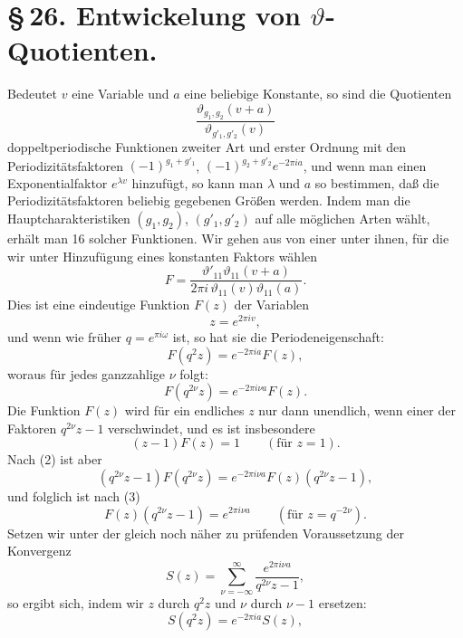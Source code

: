 \documentclass[11pt]{article}
\providecommand{\tht}{\vartheta}
\begin{document}
\section*{\S\,26. Entwickelung von $\vartheta$-Quotienten.}

Bedeutet $v$ eine Variable und $a$ eine beliebige Konstante, so sind die Quotienten
\[
\frac{\tht_{g_1,g_2}(v+a)}{\tht_{g'_1,g'_2}(v)}
\]
doppeltperiodische Funktionen zweiter Art und erster Ordnung mit den Periodizitätsfaktoren $(-1)^{g_1+g'_1}$, $(-1)^{g_2+g'_2}e^{-2\pi ia}$, und wenn man einen Exponentialfaktor $e^{\lambda v}$ hinzufügt, so kann man $\lambda$ und $a$ so bestimmen, daß die Periodizitätsfaktoren beliebig gegebenen Größen werden. Indem man die Hauptcharakteristiken $(g_1,g_2)$, $(g'_1,g'_2)$ auf alle möglichen Arten wählt, erhält man 16 solcher Funktionen. Wir gehen aus von einer unter ihnen, für die wir unter Hinzufügung eines konstanten Faktors wählen
\begin{equation}
F=\frac{\tht'_{11}\tht_{11}(v+a)}{2\pi i\,\tht_{11}(v)\tht_{11}(a)}.
\tag{1}
\end{equation}
Dies ist eine eindeutige Funktion $F(z)$ der Variablen
\[
z=e^{2\pi iv},
\]
und wenn wie früher $q=e^{\pi i\omega}$ ist, so hat sie die Periodeneigenschaft:
\begin{equation}
F(q^2z)=e^{-2\pi ia}F(z),
\tag{2}
\end{equation}
woraus für jedes ganzzahlige $\nu$ folgt:
\[
F(q^{2\nu}z)=e^{-2\pi i\nu a}F(z).
\]
Die Funktion $F(z)$ wird für ein endliches $z$ nur dann unendlich, wenn einer der Faktoren $q^{2\nu}z-1$ verschwindet, und es ist insbesondere
\begin{equation}
(z-1)F(z)=1\qquad (\text{für }z=1).
\tag{3}
\end{equation}
Nach (2) ist aber
\[
(q^{2\nu}z-1)F(q^{2\nu}z)=e^{-2\pi i\nu a}F(z)(q^{2\nu}z-1),
\]
und folglich ist nach (3)
\begin{equation}
F(z)(q^{2\nu}z-1)=e^{2\pi i\nu a}\qquad (\text{für }z=q^{-2\nu}).
\tag{4}
\end{equation}
Setzen wir unter der gleich noch näher zu prüfenden Voraussetzung der Konvergenz
\begin{equation}
S(z)=\sum_{\nu=-\infty}^{\infty}\frac{e^{2\pi i\nu a}}{q^{2\nu}z-1},
\tag{5}
\end{equation}
so ergibt sich, indem wir $z$ durch $q^2z$ und $\nu$ durch $\nu-1$ ersetzen:
\begin{equation}
S(q^2z)=e^{-2\pi ia}S(z),
\tag{6}
\end{equation}
\end{document}
